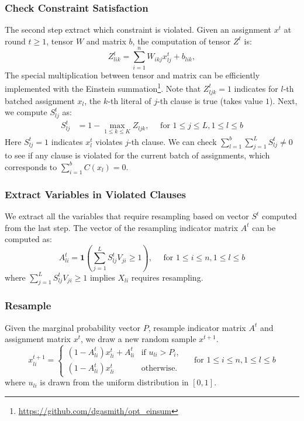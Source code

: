 \subsubsection{Check Constraint Satisfaction} { The second step extract which constraint is violated. Given an assignment $x^t$ at round $t\ge 1$, tensor $W$ and matrix $b$, the computation of tensor $Z^t$ is:}
\begin{equation*}
Z^t_{lik} =\sum_{i=1}^n W_{ikj}  x_{lj}^t+b_{lik},
\end{equation*}
{The special  multiplication between tensor and matrix can be efficiently implemented with the  Einstein summation\footnote{\url{https://github.com/dgasmith/opt_einsum}}.
%
Note that $Z^t_{ljk}=1$ indicates for $l$-th batched assignment $x_l$, the $k$-th literal of $j$-th clause is true (takes value $1$). Next, we compute $S^t_{lj}$ as:}
\begin{align*}
S^t_{lj} &=1-\max_{1\le k\le K} Z_{ljk}, \quad \text{ for } 1\le j\le L, 1\le l\le b
\end{align*}
{Here $S^t_{lj}=1$ indicates $x_l^t$ violates $j$-th clause.
%
We can check $\sum_{l=1}^b\sum_{j=1}^LS^t_{lj}\neq 0$ to see if any clause is violated for the current batch of assignments, which corresponds to $\sum_{i=1}^bC(x_l)= 0$. }


\subsubsection{Extract Variables in Violated Clauses} { We extract all the  variables that require resampling based on vector $S^t$ computed from the last step.
The vector of the resampling indicator matrix $A^t$ can be computed as:}
\begin{equation*}
A^t_{li}=\mathbf{1}\left(\sum_{j=1}^L{S_{lj}^t} V_{ji}\ge 1\right),\quad \text{ for } 1\le i\le n, 1\le l\le b
\end{equation*}
where $\sum_{j=1}^L{S_{lj}^t} V_{ji}\ge 1$ implies $X_{li}$ requires resampling.

\subsubsection{Resample} {Given the marginal probability vector $P$, resample indicator matrix $A^t$ and assignment matrix $x^t$, we draw a new random sample $x^{t+1}$. }
\begin{equation*}
 x_{li}^{t+1}=\begin{cases}
 (1-A^t_{li}) x_{li}^t+A^t_{li}  &\text{if } u_{{li}}>P_i,\\
 (1-A^t_{li}) x_{li}^t &\text{otherwise}.
 \end{cases}\quad \text{ for } 1\le i\le n, 1\le l\le b
\end{equation*}
{where $u_{li}$ is drawn from the uniform distribution in $[0, 1]$. }

